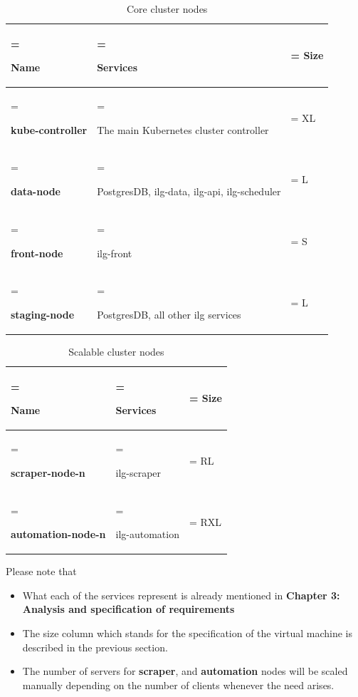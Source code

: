 \begin{table}[H]
    \renewcommand{\arraystretch}{1.5} %
    \caption{Core cluster nodes}
    \centering
    \medskip
    \begin{tabularx}{1\textwidth} {
            | >{\hsize=1\hsize\linewidth=\hsize\raggedright\arraybackslash}X
            | >{\hsize=1.8\hsize\linewidth=\hsize\raggedright\arraybackslash}X
            | >{\hsize=0.2\hsize\linewidth=\hsize\centering\arraybackslash}X |}
        \hline
        \rowcolor{primary} \textbf{Name} & \textbf{Services}                            & \textbf{Size} \\
        \hline
        \textbf{kube-controller}         & The main Kubernetes cluster controller       & XL            \\
        \hline
        \textbf{data-node}               & PostgresDB, ilg-data, ilg-api, ilg-scheduler & L             \\
        \hline
        \textbf{front-node}              & ilg-front                                    & S             \\
        \hline
        \textbf{staging-node}            & PostgresDB, all other ilg services           & L             \\
        \hline
    \end{tabularx}
\end{table}

\begin{table}[H]
    \renewcommand{\arraystretch}{1.5} %
    \caption{Scalable cluster nodes}
    \centering
    \medskip
    \begin{tabularx}{1\textwidth} {
            | >{\hsize=1.2\hsize\linewidth=\hsize\raggedright\arraybackslash}X
            | >{\hsize=1.5\hsize\linewidth=\hsize\raggedright\arraybackslash}X
            | >{\hsize=0.3\hsize\linewidth=\hsize\centering\arraybackslash}X |}
        \hline
        \rowcolor{primary} \textbf{Name} & \textbf{Services} & \textbf{Size} \\
        \hline
        \textbf{scraper-node-n}          & ilg-scraper       & RL            \\
        \hline
        \textbf{automation-node-n}       & ilg-automation    & RXL           \\
        \hline
    \end{tabularx}
\end{table}

Please note that
\begin{itemize}
    \item What each of the services represent is already mentioned in \textbf{Chapter 3: Analysis and specification of requirements}
    \item The size column which stands for the specification of the virtual machine is described in the previous section.
    \item The number of servers for \textbf{scraper}, and \textbf{automation} nodes will be scaled manually depending on the number of clients whenever the need arises.
\end{itemize}

